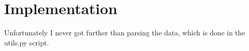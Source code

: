 \section{Implementation}

Unfortunately I never got further than parsing the data, which is done in the
utils.py script.

